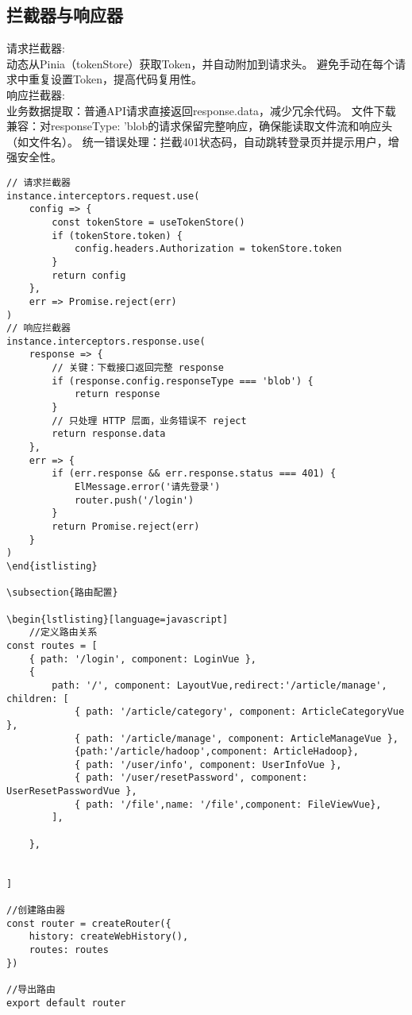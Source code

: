 \documentclass[bachelor]{thesis-uestc}
\begin{document}
\subsection{拦截器与响应器}
请求拦截器:\\
动态从Pinia（tokenStore）获取Token，并自动附加到请求头。
避免手动在每个请求中重复设置Token，提高代码复用性。\\
响应拦截器:\\
业务数据提取：普通API请求直接返回response.data，减少冗余代码。
文件下载兼容：对responseType: 'blob的请求保留完整响应，确保能读取文件流和响应头（如文件名）。
统一错误处理：拦截401状态码，自动跳转登录页并提示用户，增强安全性。
\begin{lstlisting}
// 请求拦截器
instance.interceptors.request.use(
    config => {
        const tokenStore = useTokenStore()
        if (tokenStore.token) {
            config.headers.Authorization = tokenStore.token
        }
        return config
    },
    err => Promise.reject(err)
)
// 响应拦截器
instance.interceptors.response.use(
    response => {
        // 关键：下载接口返回完整 response
        if (response.config.responseType === 'blob') {
            return response
        }
        // 只处理 HTTP 层面，业务错误不 reject
        return response.data
    },
    err => {
        if (err.response && err.response.status === 401) {
            ElMessage.error('请先登录')
            router.push('/login')
        }
        return Promise.reject(err)
    }
)
\end{istlisting}

\subsection{路由配置}

\begin{lstlisting}[language=javascript]
    //定义路由关系
const routes = [
    { path: '/login', component: LoginVue },
    {
        path: '/', component: LayoutVue,redirect:'/article/manage', children: [
            { path: '/article/category', component: ArticleCategoryVue },
            { path: '/article/manage', component: ArticleManageVue },
            {path:'/article/hadoop',component: ArticleHadoop},
            { path: '/user/info', component: UserInfoVue },
            { path: '/user/resetPassword', component: UserResetPasswordVue },
            { path: '/file',name: '/file',component: FileViewVue},
        ],

    },


]

//创建路由器
const router = createRouter({
    history: createWebHistory(),
    routes: routes
})

//导出路由
export default router

\end{lstlisting}
\end{document}
